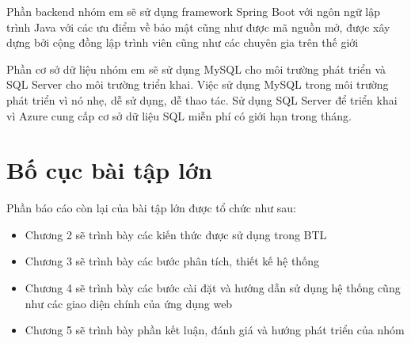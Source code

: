 \documentclass[../BTL.tex]{subfiles}
\begin{document}
Phần backend nhóm em sẽ sử dụng framework Spring Boot với ngôn ngữ lập trình Java với các ưu điểm về bảo mật cũng như được mã nguồn mở, được xây dựng bởi cộng đồng lập trình viên cũng như các chuyên gia trên thế giới

Phần cơ sở dữ liệu nhóm em sẽ sử dụng MySQL cho môi trường phát triển và SQL Server cho môi trường triển khai. Việc sử dụng MySQL trong môi trường phát triển vì nó nhẹ, dễ sử dụng, dễ thao tác. Sử dụng SQL Server để triển khai vì Azure cung cấp cơ sở dữ liệu SQL miễn phí có giới hạn trong tháng.
\section{Bố cục bài tập lớn}
Phần báo cáo còn lại của bài tập lớn được tổ chức như sau:
\begin{itemize}
    \item Chương 2 sẽ trình bày các kiến thức được sử dụng trong BTL
    \item Chương 3 sẽ trình bày các bước phân tích, thiết kế hệ thống 
    \item Chương 4 sẽ trình bày các bước cài đặt và hướng dẫn sử dụng hệ thống cũng như các giao diện chính của ứng dụng web
    \item Chương 5 sẽ trình bày phần kết luận, đánh giá và hướng phát triển của nhóm
\end{itemize}
\end{document}
